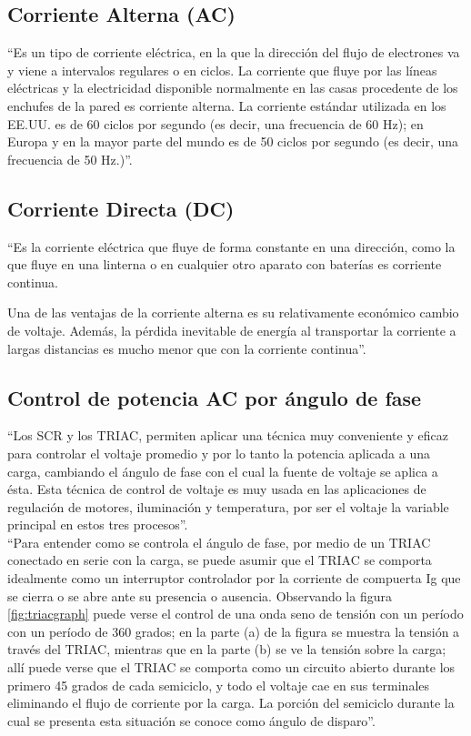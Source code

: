 \subsection{Corriente Alterna (AC)}

``Es un tipo de corriente eléctrica, en la que la dirección del flujo de electrones va y viene a intervalos regulares o en ciclos. La corriente que fluye por las líneas eléctricas y la electricidad disponible normalmente en las casas procedente de los enchufes de la pared es corriente alterna. La corriente estándar utilizada en los EE.UU. es de 60 ciclos por segundo (es decir, una frecuencia de 60 Hz); en Europa y en la mayor parte del mundo es de 50 ciclos por segundo (es decir, una frecuencia de 50 Hz.)''. \cite{Cor}

\subsection{Corriente Directa (DC)}

``Es la corriente eléctrica que fluye de forma constante en una dirección, como la que fluye en una linterna o en cualquier otro aparato con baterías es corriente continua.

Una de las ventajas de la corriente alterna es su relativamente económico cambio de voltaje. Además, la pérdida inevitable de energía al transportar la corriente a largas distancias es mucho menor que con la corriente continua''. \cite{Cor}

\subsection{Control de potencia AC por ángulo de fase}

``Los SCR y los TRIAC, permiten aplicar una técnica muy conveniente y eficaz para controlar el voltaje promedio y por lo tanto la potencia aplicada a una carga, cambiando el ángulo de fase con el cual la fuente de voltaje se aplica a ésta. Esta técnica de control de voltaje es muy usada en las aplicaciones de regulación de motores, iluminación y temperatura, por ser el voltaje la variable principal en estos tres procesos''.\cite{CEKIT}\\

``Para entender como se controla el ángulo de fase, por medio de un TRIAC conectado en serie con la carga, se puede asumir que el TRIAC se comporta idealmente como un interruptor controlador por la corriente de compuerta Ig que se cierra o se abre ante su presencia o ausencia. Observando la figura \ref{fig:triacgraph} puede verse el control de una onda seno de tensión con un período con un período de 360 grados; en la parte (a) de la figura se muestra la tensión a través del TRIAC, mientras que en la parte (b) se ve la tensión sobre la carga; allí puede verse que el TRIAC se comporta como un circuito abierto durante los primero 45 grados de cada semiciclo, y todo el voltaje cae en sus terminales eliminando el flujo de corriente por la carga. La porción del semiciclo durante la cual se presenta esta situación se conoce como ángulo de disparo''\cite{CEKIT}.\\

